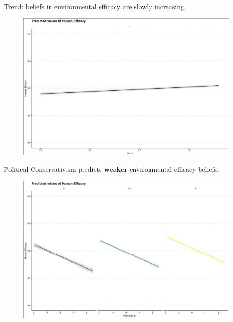 \documentclass{beamer}
\begin{document}
\begin{frame}{Trend: beliefs in environmental efficacy are slowly increasing}
\begin{figure}
\includegraphics[width=.8\textwidth,height=\textheight,keepaspectratio]{Figures/EFFICACY_TIME.png}
\end{figure}
\end{frame}
% 
% 
% 
% 

\begin{frame}{Political Conservativism  predicts {\bf weaker} environmental efficacy beliefs.}
\begin{figure}
\includegraphics[width=.8\textwidth,height=\textheight,keepaspectratio]{Figures/EFFICACY_Pol.Orient.S.png}
\end{figure}
\end{frame}
\end{document}
